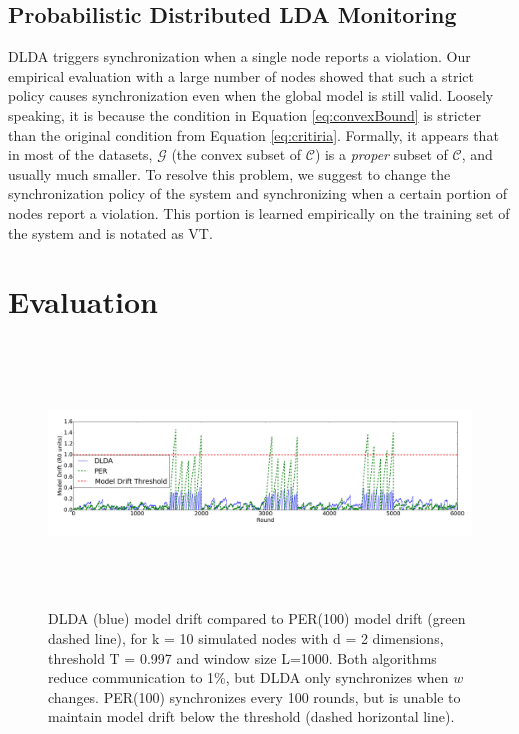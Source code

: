 \documentclass{vldb}
\begin{document}
\subsection{Probabilistic Distributed LDA Monitoring}\label{sec:PDLDA}

DLDA triggers synchronization when a single node reports a violation.
Our empirical evaluation with a large number of nodes showed that such a strict
policy causes synchronization even when the global model is still valid. Loosely speaking, it is because the condition in Equation \ref{eq:convexBound} is stricter than the original condition from Equation \ref{eq:critiria}. Formally, it appears that in most of the datasets, $\mathcal{G}$ (the  convex subset of $\mathcal{C}$) is a \textit{proper} subset of $\mathcal{C}$, and usually much smaller. To resolve this problem, we suggest to change the synchronization policy of the system and synchronizing when a certain portion of nodes report a violation.
This portion is learned empirically on the training set of the system and is notated as VT.




\section{Evaluation}
\begin{figure}[ht]
	\centering
	\includegraphics[width=\textwidth, height=7cm]{graphics/PERvsDLDAoverTime.png}
	\caption{ DLDA (blue) model drift compared to PER(100) model drift (green dashed line), for k = 10 simulated nodes with d = 2 dimensions, threshold T = 0.997 and window size L=1000. Both algorithms reduce communication to 1\%, but DLDA
	only synchronizes when $w$ changes. PER(100) synchronizes every 100 rounds,
	but is unable to maintain model drift below the threshold (dashed horizontal line).}
	\label{PERvsDLDAoverTime}
\end{figure}
\end{document}
